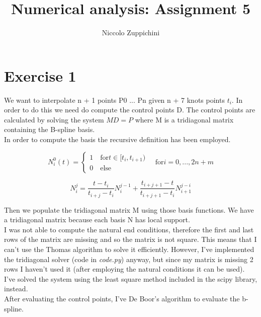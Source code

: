 \documentclass[12pt]{article}
\title{Numerical analysis: Assignment 5}
\author{Niccolo Zuppichini}
\begin{document}
\maketitle
\section*{Exercise 1}

We want to interpolate n + 1 points P0 ... Pn given n + 7 knots points $t_i$. In order to do this we need do compute the control points D. The control points are calculated by solving the system $MD = P$ where M is a tridiagonal matrix containing the B-spline basis. \\
In order to compute the basis the recursive definition has been employed. 

\begin{equation}
	N_i^0(t) =
	\begin{cases}
		1 \quad \textrm{for} t \in [t_i, t_{i+1}) \\
		0 \quad \textrm{else}
	\end{cases}
	\quad \textrm{for} i = 0, ..., 2n + m
\end{equation}

\begin{equation}
	N_i^j = \frac{t - t_i}{t_{i+j} - t_i} N^{j-1}_i + \frac{t_{i+j+1} - t}{t_{i+j+1} - t_i} N^{j-i}_{i+1}
\end{equation}


Then we populate the tridiagonal matrix M using those basis functions. We have a tridiagonal matrix because each basis N has local support. \\

I was not able  to compute the natural end conditions, therefore the first and last rows of the matrix are missing and so the matrix is not square. This means that I can't use the Thomas algorithm to solve it efficiently. However, I've implemented the tridiagonal solver (code in \textit{code.py}) anyway, but since my matrix is missing 2 rows I haven't used it (after employing the natural conditions it can be used). I've solved the system using the least square method included in the scipy library, instead. \\
After evaluating the control points, I've De Boor’s algorithm to evaluate the b-spline. \\
\end{document}
